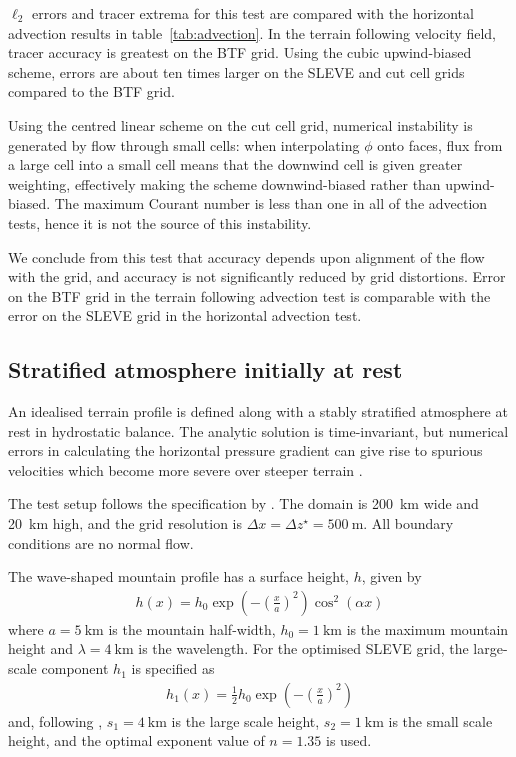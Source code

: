 \documentclass{ametsoc}
\begin{document}
$\ell_2$ errors and tracer extrema for this test are compared with the horizontal advection results in table~\ref{tab:advection}.  In the terrain following velocity field, tracer accuracy is greatest on the BTF grid.  Using the cubic upwind-biased scheme, errors are about ten times larger on the SLEVE and cut cell grids compared to the BTF grid.

Using the centred linear scheme on the cut cell grid, numerical instability is generated by flow through small cells: when interpolating \(\phi\) onto faces, flux from a large cell into a small cell means that the downwind cell is given greater weighting, effectively making the scheme downwind-biased rather than upwind-biased.  The maximum Courant number is less than one in all of the advection tests, hence it is not the source of this instability.

We conclude from this test that accuracy depends upon alignment of the flow with the grid, and accuracy is not significantly reduced by grid distortions.  Error on the BTF grid in the terrain following advection test is comparable with the error on the SLEVE grid in the horizontal advection test.

\subsection{Stratified atmosphere initially at rest}
\label{sec:resting}

An idealised terrain profile is defined along with a stably stratified atmosphere at rest in hydrostatic balance.  The analytic solution is time-invariant, but numerical errors in calculating the horizontal pressure gradient can give rise to spurious velocities which become more severe over steeper terrain \citep{klemp2011}.

The test setup follows the specification by \cite{klemp2011}.  The domain is \SI{200}{\kilo\meter} wide and \SI{20}{\kilo\meter} high, and the grid resolution is \(\Delta x = \Delta z^\star = \SI{500}{\meter}\).  All boundary conditions are no normal flow.

The wave-shaped mountain profile has a surface height, $h$, given by
\begin{align}
	h(x) = h_0 \exp \left( - \left( \frac{x}{a} \right)^2 \right) \cos^2 \left( \alpha x \right) \label{eqn:resting:mountain}
\end{align}
where $a = \SI{5}{\kilo\meter}$ is the mountain half-width, $h_0 = \SI{1}{\kilo\meter}$ is the maximum mountain height and $\lambda = \SI{4}{\kilo\meter}$ is the wavelength.  For the optimised SLEVE grid, the large-scale component $h_1$ is specified as
\begin{align}
h_1(x) = \frac{1}{2} h_0 \exp \left( - \left( \frac{x}{a} \right)^2 \right)
\end{align}
and, following \cite{leuenberger2010}, $s_1 = \SI{4}{\kilo\meter}$ is the large scale height, $s_2 = \SI{1}{\kilo\meter}$ is the small scale height, and the optimal exponent value of $n = 1.35$ is used.
\end{document}

